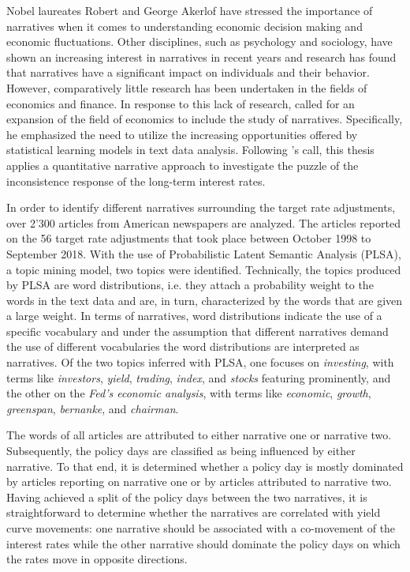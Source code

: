\documentclass[11pt,a4paper,english,oneside]{book}
\numberwithin{equation}{chapter}
\begin{document}
Nobel laureates Robert \citeauthor{Shiller.2017} and George Akerlof have stressed the importance of narratives when it comes to understanding economic decision making and economic fluctuations. Other disciplines, such as psychology and sociology, have shown an increasing interest in narratives in recent years and research has found that narratives have a significant impact on individuals and their behavior. However, comparatively little research has been undertaken in the fields of economics and finance. In response to this lack of research, \citeauthor{Shiller.2017} called for an expansion of the field of economics to include the study of narratives. Specifically, he emphasized the need to utilize the increasing opportunities offered by statistical learning models in text data analysis.
Following \citeauthor{Shiller.2017}'s call, this thesis applies a quantitative narrative approach to investigate the puzzle of the inconsistence response of the long-term interest rates.

In order to identify different narratives surrounding the target rate adjustments, over 2'300 articles from American newspapers are analyzed. The articles reported on the 56 target rate adjustments that took place between October 1998 to September 2018. With the use of Probabilistic Latent Semantic Analysis (PLSA), a topic mining model, two topics were identified. Technically, the topics produced by PLSA are word distributions, i.e. they attach a probability weight to the words in the text data and are, in turn, characterized by the words that are given a large weight. In terms of narratives, word distributions indicate the use of a specific vocabulary and under the assumption that different narratives demand the use of different vocabularies the word distributions are interpreted as narratives. Of the two topics inferred with PLSA, one focuses on \textit{investing}, with terms like \textit{investors}, \textit{yield}, \textit{trading}, \textit{index}, and \textit{stocks} featuring prominently, and the other on the \textit{Fed's economic analysis}, with terms like \textit{economic}, \textit{growth}, \textit{greenspan}, \textit{bernanke}, and \textit{chairman}. 

The words of all articles are attributed to either narrative one or narrative two. Subsequently, the policy days are classified as being influenced by either narrative. To that end, it is determined whether a policy day is mostly dominated by articles reporting on narrative one or by articles attributed to narrative two. Having achieved a split of the policy days between the two narratives, it is straightforward to determine whether the narratives are correlated with yield curve movements: one narrative should be associated with a co-movement of the interest rates while the other narrative should dominate the policy days on which the rates move in opposite directions. 
\end{document}
